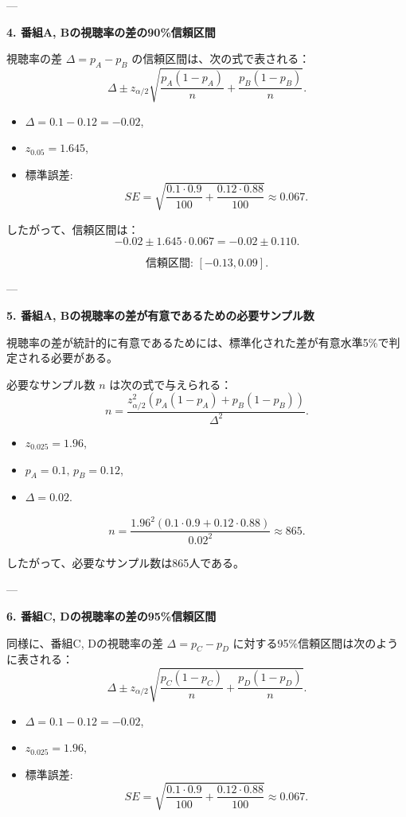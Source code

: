 \documentclass[10pt]{jsarticle}
\begin{document}
---

{\bf 4. 番組A, Bの視聴率の差の90\%信頼区間}

視聴率の差 \(\Delta = p_A - p_B\) の信頼区間は、次の式で表される：
\[
\Delta \pm z_{\alpha/2} \sqrt{\frac{p_A (1 - p_A)}{n} + \frac{p_B (1 - p_B)}{n}}.
\]

\begin{itemize}
    \item \(\Delta = 0.1 - 0.12 = -0.02\),
    \item \(z_{0.05} = 1.645\),
    \item 標準誤差:
    \[
    SE = \sqrt{\frac{0.1 \cdot 0.9}{100} + \frac{0.12 \cdot 0.88}{100}} \approx 0.067.
    \]
\end{itemize}

したがって、信頼区間は：
\[
-0.02 \pm 1.645 \cdot 0.067 = -0.02 \pm 0.110.
\]

\[
\text{信頼区間: } [-0.13, 0.09].
\]

---

{\bf 5. 番組A, Bの視聴率の差が有意であるための必要サンプル数}

視聴率の差が統計的に有意であるためには、標準化された差が有意水準5\%で判定される必要がある。

必要なサンプル数 \(n\) は次の式で与えられる：
\[
n = \frac{z_{\alpha/2}^2 \left( p_A (1 - p_A) + p_B (1 - p_B) \right)}{\Delta^2}.
\]

\begin{itemize}
    \item \(z_{0.025} = 1.96\),
    \item \(p_A = 0.1, \, p_B = 0.12\),
    \item \(\Delta = 0.02\).
\end{itemize}

\[
n = \frac{1.96^2 \left( 0.1 \cdot 0.9 + 0.12 \cdot 0.88 \right)}{0.02^2} \approx 865.
\]

したがって、必要なサンプル数は865人である。

---

{\bf 6. 番組C, Dの視聴率の差の95\%信頼区間}

同様に、番組C, Dの視聴率の差 \(\Delta = p_C - p_D\) に対する95\%信頼区間は次のように表される：
\[
\Delta \pm z_{\alpha/2} \sqrt{\frac{p_C (1 - p_C)}{n} + \frac{p_D (1 - p_D)}{n}}.
\]

\begin{itemize}
    \item \(\Delta = 0.1 - 0.12 = -0.02\),
    \item \(z_{0.025} = 1.96\),
    \item 標準誤差:
    \[
    SE = \sqrt{\frac{0.1 \cdot 0.9}{100} + \frac{0.12 \cdot 0.88}{100}} \approx 0.067.
    \]
\end{itemize}
\end{document}
